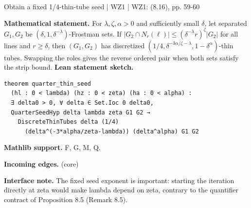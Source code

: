 \documentclass[10pt,a4paper]{article}
\newcommand{\nodecard}[1]{\hyperlink{node-#1}{\texttt{\detokenize{#1}}}}
\begin{document}
\begin{minipage}{\linewidth}
\hypertarget{node-L8_8}{}
\begin{tcolorbox}[colback=white,colframe=radialfg,colbacktitle=radialbg,coltitle=ink,boxrule=0.45pt,arc=1.6mm,left=3mm,right=3mm,top=2mm,bottom=2mm,title={\sffamily\bfseries WZ1 Lemma 8.8 \hfill \texttt{L8\_8}}]
{\sffamily\small\color{muted}Obtain a fixed 1/4-thin-tube seed | WZ1 | WZ1: (8.16), pp. 59-60}\par
\textbf{Mathematical statement.} For $\lambda,\zeta,\alpha>0$ and sufficiently small $\delta$, let separated $G_1,G_2$ be $(\delta,1,\delta^{-\lambda})$-Frostman sets.
If $|G_2\cap N_r(\ell)|\le(\delta^{-\lambda}r)^\zeta |G_2|$ for all lines and $r\ge\delta$, then
$(G_1,G_2)$ has discretized $(1/4,\delta^{-3\alpha/\zeta-\lambda},1-\delta^\alpha)$-thin tubes.
Swapping the roles gives the reverse ordered pair when both sets satisfy the strip bound.
\smallskip\textbf{Lean statement sketch.}
\begin{Verbatim}[fontsize=\small,breaklines=true,breakanywhere=true,tabsize=2]
theorem quarter_thin_seed
  (hl : 0 < lambda) (hz : 0 < zeta) (ha : 0 < alpha) :
  ∃ delta0 > 0, ∀ delta ∈ Set.Ioc 0 delta0,
  QuarterSeedHyp delta lambda zeta G1 G2 →
    DiscreteThinTubes delta (1/4)
      (delta^(-3*alpha/zeta-lambda)) (delta^alpha) G1 G2
\end{Verbatim}
{\footnotesize\textbf{Mathlib support.} F, G, M, Q.\par
\textbf{Incoming edges.} \nodecard{DFrost} (core)\par}
{\footnotesize\textbf{Interface note.} The fixed seed exponent is important: starting the iteration directly at zeta would make lambda depend on zeta, contrary to the quantifier contract of Proposition 8.5 (Remark 8.5).}
\end{tcolorbox}\end{minipage}\par\medskip
\end{document}
